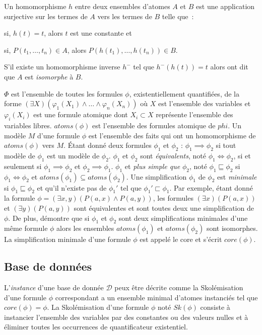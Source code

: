 Un homomorphisme $h$ entre deux ensembles d'atomes $A$ et $B$ est une application surjective sur les termes de $A$ vers les termes de $B$ telle que :
\begin{enumerate*}[label=(\roman*)]
    \item si, $h(t) = t$, alors $t$ est une constante et
    \item si, $P(t_1, \dots, t_n) \in A$, alors $P(h(t_1), \dots, h(t_n)) \in B$.
\end{enumerate*}
S'il existe un homomorphisme inverse $h^-$ tel que $h^-(h(t)) = t$ alors ont dit que $A$ est \textit{isomorphe} à $B$.

$\Phi$ est l'ensemble de toutes les formules $\phi$, existentiellement quantifiées, de la forme $(\exists X)(\varphi_1(X_1) \land \dots \land \varphi_n(X_n))$ où $X$ est l'ensemble des variables et $\varphi_i(X_i)$ est une formule atomique dont $X_i \subset X$ représente l'ensemble des variables libres.
$atoms(\phi)$ est l'ensemble des formules atomique de $phi$.
Un modèle $M$ d'une formule $\phi$ est l'ensemble des faits qui ont un homomorphisme de $atoms(\phi)$ vers $M$.
Étant donné deux formules $\phi_1$ et $\phi_2$ : $\phi_1 \implies \phi_2$ si tout modèle de $\phi_1$ est un modèle de $\phi_2$.
$\phi_1$ et $\phi_2$ sont \textit{équivalents}, noté $\phi_1 \iff \phi_2$, si et seulement si $\phi_1 \implies \phi_2$ et $\phi_2 \implies \phi_1$.
$\phi_1$ et \textit{plus simple que} $\phi_2$, noté $\phi_1 \sqsubseteq \phi_2$ si $\phi_1 \iff \phi_2$ et $atoms(\phi_1) \subseteq atoms(\phi_2)$.
Une simplification $\phi_1$ de $\phi_2$ est \textit{minimale} si $\phi_1 \sqsubseteq \phi_2$ et qu'il n'existe pas de $\phi_1'$ tel que $\phi_1' \sqsubset \phi_1$.
Par exemple, étant donné la formule $\phi = (\exists x, y)(P(a, x) \land P(a, y))$, les formules $(\exists x)(P(a, x))$ et $(\exists y)(P(a, y))$ sont équivalentes et sont toutes deux une simplification de $\phi$.
De plus, \cite{chabinConsistentUpdatingDatabases2020} démontre que si $\phi_1$ et $\phi_2$ sont deux simplifications minimales d'une même formule $\phi$ alors les ensembles $atoms(\phi_1)$ et $atoms(\phi_2)$ sont isomorphes.
La simplification minimale d'une formule $\phi$ est appelé le core et s'écrit $core(\phi)$.

\subsection{Base de données}
\label{sec:update:pre:db}

L'\textit{instance} d'une base de donnée $\mathcal{D}$ peux être décrite comme la Skolémisation d'une formule $\phi$ correspondant a un ensemble minimal d'atomes instanciés tel que $core(\phi) = \phi$.
La Skolémisation d'une formule $\phi$ noté $Sk(\phi)$ consiste à instancier l'ensemble des variables par des constantes ou des valeurs nulles et à éliminer toutes les occurrences de quantificateur existentiel.

